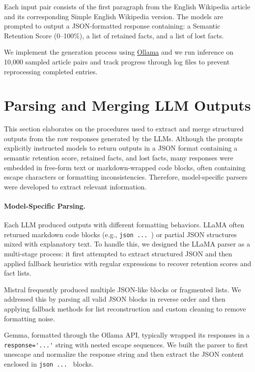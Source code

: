 \documentclass{DESSThesis}
\begin{document}
Each input pair consists of the first paragraph from the English Wikipedia article and its corresponding Simple English Wikipedia version. The models are prompted to output a JSON-formatted response containing: a Semantic Retention Score (0--100\%), a list of retained facts, and a list of lost facts. 

We implement the generation process using \href{https://ollama.com/}{\color{blue}
Ollama} and we run inference on 10,000 sampled article pairs and track progress through log files to prevent reprocessing completed entries.

\section{Parsing and Merging LLM Outputs}

This section elaborates on the procedures used to extract and merge structured outputs from the raw responses generated by the LLMs. Although the prompts explicitly instructed models to return outputs in a JSON format containing a semantic retention score, retained facts, and lost facts, many responses were embedded in free-form text or markdown-wrapped code blocks, often containing escape characters or formatting inconsistencies. Therefore, model-specific parsers were developed to extract relevant information. 

\paragraph{Model-Specific Parsing.}
Each LLM produced outputs with different formatting behaviors. LLaMA often returned markdown code blocks (e.g., \verb|json ... |) or partial JSON structures mixed with explanatory text. To handle this, we designed the LLaMA parser as a multi-stage process: it first attempted to extract structured JSON and then applied fallback heuristics with regular expressions to recover retention scores and fact lists.

Mistral frequently produced multiple JSON-like blocks or fragmented lists. We addressed this by parsing all valid JSON blocks in reverse order and then applying fallback methods for list reconstruction and custom cleaning to remove formatting noise.

Gemma, formatted through the Ollama API, typically wrapped its responses in a \verb|response='...'| string with nested escape sequences. We built the parser to first unescape and normalize the response string and then extract the JSON content enclosed in \verb|json ... | blocks.
\end{document}
